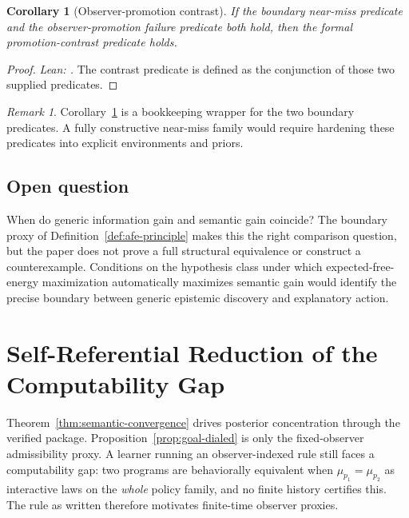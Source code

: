 \documentclass[11pt]{article}
\newtheorem{corollary}[theorem]{Corollary}
\theoremstyle{definition}
\theoremstyle{remark}
\newtheorem{remark}[theorem]{Remark}
\theoremstyle{plain}
\theoremstyle{definition}
\begin{document}
\begin{corollary}[Observer-promotion contrast]
\label{cor:promotion-contrast}
If the boundary near-miss predicate and the observer-promotion failure predicate both hold, then the formal promotion-contrast predicate holds.
\end{corollary}

\begin{proof}
\noindent\emph{Lean: .}
The contrast predicate is defined as the conjunction of those two supplied predicates.
\end{proof}

\begin{remark}
\label{rem:promotion-contrast-interpretation}
Corollary~\ref{cor:promotion-contrast} is a bookkeeping wrapper for the two boundary predicates. A fully constructive near-miss family would require hardening these predicates into explicit environments and priors.
\end{remark}


\subsection*{Open question}

When do generic information gain and semantic gain coincide? The boundary proxy of Definition~\ref{def:afe-principle} makes this the right comparison question, but the paper does not prove a full structural equivalence or construct a counterexample. Conditions on the hypothesis class under which expected-free-energy maximization automatically maximizes semantic gain would identify the precise boundary between generic epistemic discovery and explanatory action.

\section{Self-Referential Reduction of the Computability Gap}
\label{sec:self-ref}

Theorem~\ref{thm:semantic-convergence} drives posterior concentration through the verified package. Proposition~\ref{prop:goal-dialed} is only the fixed-observer admissibility proxy. A learner running an observer-indexed rule still faces a computability gap: two programs are behaviorally equivalent when $\mu_{p_1}=\mu_{p_2}$ as interactive laws on the \emph{whole} policy family, and no finite history certifies this. The rule as written therefore motivates finite-time observer proxies.
\end{document}
